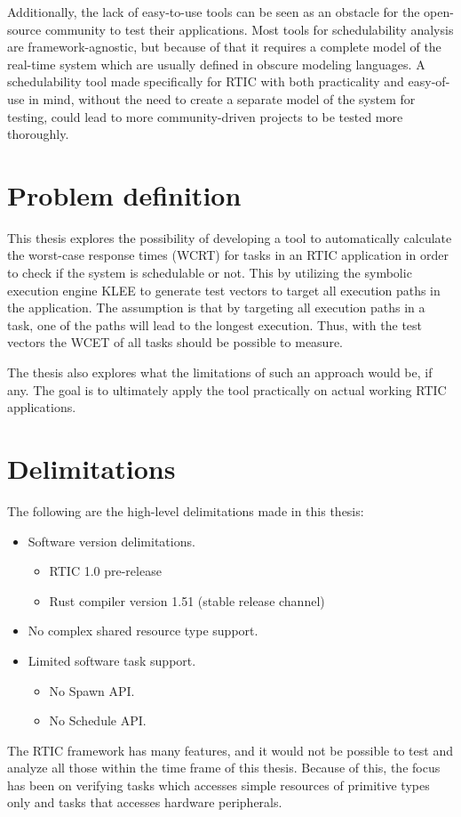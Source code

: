 Additionally, the lack of easy-to-use tools can be seen as an obstacle for the
open-source community to test their applications. Most tools for schedulability
analysis are framework-agnostic, but because of that it requires a complete
model of the real-time system which are usually defined in obscure modeling
languages. A schedulability tool made specifically for RTIC with both
practicality and easy-of-use in mind, without the need to create a separate
model of the system for testing, could lead to more community-driven projects
to be tested more thoroughly.

\section{Problem definition}
This thesis explores the possibility of developing a tool to automatically
calculate the worst-case response times (WCRT) for tasks in an RTIC application
in order to check if the system is schedulable or not. This by utilizing the
symbolic execution engine KLEE to generate test vectors to target all execution
paths in the application. The assumption is that by targeting all execution
paths in a task, one of the paths will lead to the longest execution. Thus,
with the test vectors the WCET of all tasks should be possible to measure.

The thesis also explores what the limitations of such an approach would be, if
any. The goal is to ultimately apply the tool practically on actual working
RTIC applications.

\section{Delimitations}
The following are the high-level delimitations made in this thesis:
\begin{itemize}
    \item Software version delimitations.
    \begin{itemize}
        \item RTIC 1.0 pre-release
        \item Rust compiler version 1.51 (stable release channel)
    \end{itemize}
    \item No complex shared resource type support.
    \item Limited software task support.
    \begin{itemize}
        \item No Spawn API\@.
        \item No Schedule API\@.
    \end{itemize}
\end{itemize}
The RTIC framework has many features, and it would not be possible to test and
analyze all those within the time frame of this thesis. Because of this, the
focus has been on verifying tasks which accesses simple resources of primitive
types only and tasks that accesses hardware peripherals.

